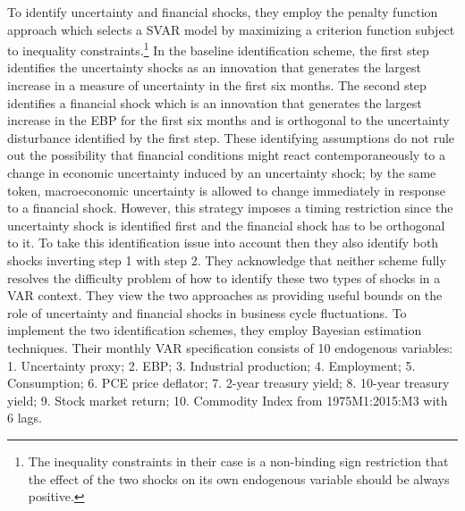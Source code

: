 \documentclass{article}
\begin{document}
{To identify uncertainty and financial shocks, they employ the penalty function approach which selects a SVAR model by maximizing a criterion function subject to inequality constraints.\footnote{The inequality constraints in their case is a non-binding sign restriction that the effect of the two shocks on its own endogenous variable should be always positive.} In the baseline identification scheme, the first step identifies the uncertainty shocks as an innovation that generates the largest increase in a measure of uncertainty in the first six months. The second step identifies a financial shock which is an innovation that generates the largest increase in the EBP for the first six months and is orthogonal to the uncertainty disturbance identified by the first step. These identifying assumptions do not rule out the possibility that financial conditions might react contemporaneously to a change in economic uncertainty induced by an uncertainty shock; by the same token, macroeconomic uncertainty is allowed to change immediately in response to a financial shock. However, this strategy imposes a timing restriction since the uncertainty shock is identified first and the financial shock has to be orthogonal to it. To take this identification issue into account then they also identify both shocks inverting step 1 with step 2. They acknowledge that neither scheme fully resolves the difficulty problem of how to identify these two types of shocks in a VAR context. They view the two approaches as providing useful bounds on the role of uncertainty and financial shocks in business cycle fluctuations. To implement the two identification schemes, they employ Bayesian estimation techniques. Their monthly VAR specification consists of 10 endogenous variables: 1. Uncertainty proxy; 2. EBP; 3. Industrial production; 4. Employment; 5. Consumption; 6. PCE price deflator; 7. 2-year treasury yield; 8. 10-year treasury yield; 9. Stock market return; 10. Commodity Index from 1975M1:2015:M3 with 6 lags.

}
\end{document}
